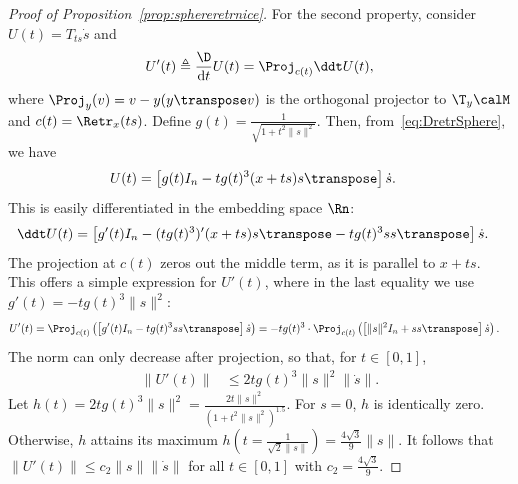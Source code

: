 \begin{proof}[Proof of Proposition~\ref{prop:sphereretrnice}]
	For the second property, consider $U(t) = T_{ts} \dot s$ and
	\begin{align*}
		 U'(t) \triangleq \frac{\D}{\mathrm{d}t} U(t) = \Proj_{c(t)} \ddt U(t),
	\end{align*}
	where $\Proj_y(v) = v - y (y\transpose v)$ is the orthogonal projector to $\T_y\calM$ and $c(t) = \Retr_x(ts)$. Define $g(t) = \frac{1}{\sqrt{1+t^2\|s\|^2}}$. Then, from~\eqref{eq:DretrSphere}, we have
	\begin{align}
		U(t) & = \left[ g(t) I_n - t g(t)^3 (x+ts)s\transpose \right] \dot s.
	\end{align}
	This is easily differentiated in the embedding space $\Rn$:
	\begin{align*}
		\ddt U(t) & = \left[ g'(t) I_n - (t g(t)^3)' (x+ts)s\transpose - t g(t)^3 ss\transpose \right] \dot s.
	\end{align*}
	The projection at $c(t)$ zeros out the middle term, as it is parallel to $x+ts$. This offers a simple expression for $U'(t)$, where in the last equality we use $g'(t) = -t g(t)^3 \|s\|^2$:
	\begin{align*}
		U'(t) & = \Proj_{c(t)}\left( \left[ g'(t) I_n - t g(t)^3 ss\transpose \right] \dot s \right) = -t g(t)^3 \cdot  \Proj_{c(t)}\left( \left[ \|s\|^2 I_n + ss\transpose \right] \dot s \right).
	\end{align*}
	The norm can only decrease after projection, so that, for $t \in [0, 1]$, %
	\begin{align*}
		\|U'(t)\| & \leq 2 t g(t)^3 \|s\|^2 \|\dot s\|.
	\end{align*}
	Let $h(t) = 2 t g(t)^3 \|s\|^2 = \frac{2t\|s\|^2}{(1+t^2 \|s\|^2)^{1.5}}$. For $s = 0$, $h$ is identically zero. Otherwise, $h$ attains its maximum $h\left(t = \frac{1}{\sqrt{2} \|s\|}\right) = \frac{4 \sqrt{3}}{9} \|s\|$. It follows that $\|U'(t)\| \leq c_2 \|s\| \|\dot s\|$ for all $t \in [0, 1]$ with $c_2 = \frac{4\sqrt{3}}{9}$.
	

\end{proof}
